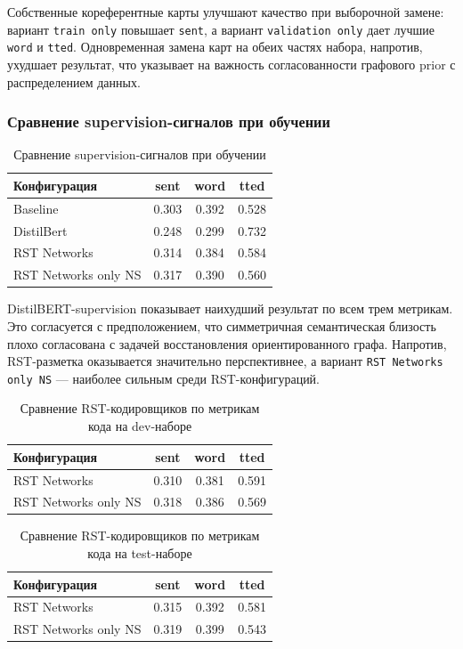 \documentclass[12pt,a4paper]{article}
\begin{document}
Собственные кореферентные карты улучшают качество при выборочной замене: вариант \texttt{train only} повышает \texttt{sent}, а вариант \texttt{validation only} дает лучшие \texttt{word} и \texttt{tted}. Одновременная замена карт на обеих частях набора, напротив, ухудшает результат, что указывает на важность согласованности графового prior с распределением данных.

\subsubsection{Сравнение supervision-сигналов при обучении}

\begin{table}[H]
\centering
\caption{Сравнение supervision-сигналов при обучении}
\begin{tabular}{lccc}
\toprule
Конфигурация & sent & word & tted \\
\midrule
Baseline & 0.303 & 0.392 & 0.528 \\
DistilBert & 0.248 & 0.299 & 0.732 \\
RST Networks & 0.314 & 0.384 & 0.584 \\
RST Networks only NS & 0.317 & 0.390 & 0.560 \\
\bottomrule
\end{tabular}
\end{table}

DistilBERT-supervision показывает наихудший результат по всем трем метрикам. Это согласуется с предположением, что симметричная семантическая близость плохо согласована с задачей восстановления ориентированного графа. Напротив, RST-разметка оказывается значительно перспективнее, а вариант \texttt{RST Networks only NS} --- наиболее сильным среди RST-конфигураций.

\begin{table}[H]
\centering
\caption{Сравнение RST-кодировщиков по метрикам кода на dev-наборе}
\begin{tabular}{lccc}
\toprule
Конфигурация & sent & word & tted \\
\midrule
RST Networks & 0.310 & 0.381 & 0.591 \\
RST Networks only NS & 0.318 & 0.386 & 0.569 \\
\bottomrule
\end{tabular}
\end{table}

\begin{table}[H]
\centering
\caption{Сравнение RST-кодировщиков по метрикам кода на test-наборе}
\begin{tabular}{lccc}
\toprule
Конфигурация & sent & word & tted \\
\midrule
RST Networks & 0.315 & 0.392 & 0.581 \\
RST Networks only NS & 0.319 & 0.399 & 0.543 \\
\bottomrule
\end{tabular}
\end{table}
\end{document}
